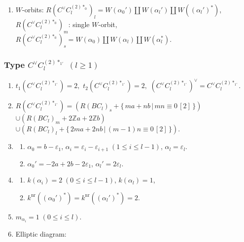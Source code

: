 \documentclass[11pt]{amsart}
\newcommand{\Z}{\mathbb{Z}}
\newcommand{\nr}{\mathrm{nr}}
\newcommand{\vep}{\varepsilon}
\begin{document}
{\begin{enumerate}
\begin{center}
{}
\end{center}
\item $W$-orbits: $R(C^\vee C_l^{(2)\ast_{0}})_l=W(\alpha_0') \amalg W(\alpha_l') \amalg W((\alpha_l')^\ast)$, \\
\phantom{$W$-orbits:} $R(C^\vee C_l^{(2)\ast_{0}})_m$: single $W$-orbit,  \\ 
\phantom{$W$-orbits:} $R(C^\vee C_l^{(2)\ast_{0}})_s=W(\alpha_0) \amalg W(\alpha_l) \amalg W(\alpha_l^\ast)$.
\end{enumerate}

\subsubsection{Type $C^\vee C_l^{(2)\ast_{1'}}$ $(l\geq 1)$}\label{data:CC-9}
\begin{enumerate}
\item $t_1(C^\vee C_l^{(2)\ast_{1'}})=2,$ \quad $t_2(C^\vee C_l^{(2)\ast_{1'}})=2,$ \quad $(C^\vee C_l^{(2)\ast_{1'}})^\vee = C^\vee C_l^{(2)\ast_{1'}}.$
\item  $R(C^\vee C_l^{(2)\ast_{1'}})=(R(BC_l)_s+\{ \,ma+nb\, \vert\, mn \equiv 0\, [2]\,\})$ \\
 $\cup (R(BC_l)_m+2\Z a+2\Z b)$ \\
 $\cup (R(BC_l)_l+\{ \,2ma+2nb\, \vert\, (m-1)n \equiv 0\, [2]\,\})$. 
\item 
\begin{enumerate}
\item[i)] $\alpha_0=b-\vep_1$, $\alpha_i=\vep_i-\vep_{i+1}\; 
(1\leq i\leq l-1)$, $\alpha_l=\vep_l$. 
\item[ii)] $\alpha_0'= -2a+2b-2\vep_1$, \; $\alpha_l'=2\vep_l$.
\end{enumerate} 
\item 
\begin{enumerate}
\item[i)] $k(\alpha_i)=2\; (0\leq  i \leq l-1)$, \; $k(\alpha_l)=1$, 
\item[ii)] $k^{\nr}((\alpha_0')^\ast)=k^{\nr}((\alpha_l')^\ast)=2$. 
\end{enumerate}
\item $m_{\alpha_i}=1\; (0 \leq i \leq l)$.  
\item Elliptic diagram: 





\end{enumerate}}
\end{document}
